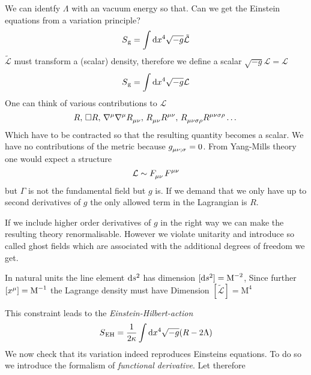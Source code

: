We can identfy $\Lambda$ with an vacuum energy so that. Can we get the Einstein
equations from a variation principle?
\begin{equation}
S\textsubscript{g}=\int\dif x^4 \sqrt{-g}\tilde{\mathcal{L}}
\end{equation}
$\tilde{\mathcal{L}}$ must transform a (scalar) density, therefore we define a
scalar $\sqrt{-g}\mathcal{L}=\mathcal{L}$
\begin{equation}
S\textsubscript{g}=\int\dif x^4 \sqrt{-g}\mathcal{L}
\end{equation}
One can think of various contributions to $\mathcal{L}$
\begin{equation*}
R,\, \square
R,\,\tensor{\nabla}{^\mu}\tensor{\nabla}{^\mu}\tensor{R}{_\mu_\nu},\,
\tensor{R}{_\mu_\nu}\tensor{R}{^\mu^\nu}
,\,\tensor{R}{_\mu_\nu_\sigma_\rho}\tensor{R}{^\mu^\nu^\sigma^\rho}\dots
\end{equation*}
Which have to be contracted so that the resulting quantity becomes a scalar.
We have no contributions of the metric because
$\tensor{g}{_\mu_\nu_{;\sigma}}=0$. From Yang-Mills theory one would expect a
structure 
\begin{equation}
\mathcal{L}\sim\tensor{F}{_\mu_\nu}\tensor{F}{^\mu^\nu}
\end{equation}
but $\Gamma$ is not the fundamental field but $g$ is. If we demand that we only
have up to second derivatives of $g$ the only allowed term in the Lagrangian is
$R$.
\begin{sidenote}
If we include higher order derivatives of $g$ in the right way we can make the
resulting theory renormalisable. However we violate unitarity and introduce so
called ghost fields which are associated with the additional degrees of freedom
we get.
\end{sidenote}
\begin{remark}[Dimensions]
In natural units the line element $\dif s^2$ has dimension ${[\dif
s^2]=\textrm{M}^{-2}}$, Since further
${\left[\tensor{x}{^\mu}\right]=\textrm{M}^{-1}}$ the Lagrange density must have Dimension ${\left[\tilde{\mathcal{L}}\right]=\textrm{M}^{4}}$
\end{remark} 
This constraint leads to the \emph{Einstein-Hilbert-action}
\begin{equation}
S\textsubscript{EH}=\frac{1}{2\kappa}\int\dif x^4 \sqrt{-g}(R-2\Lambda)
\end{equation}
We now check that its variation indeed reproduces Einsteins equations. To do
so we introduce the formalism of \emph{functional derivative}. Let therefore

